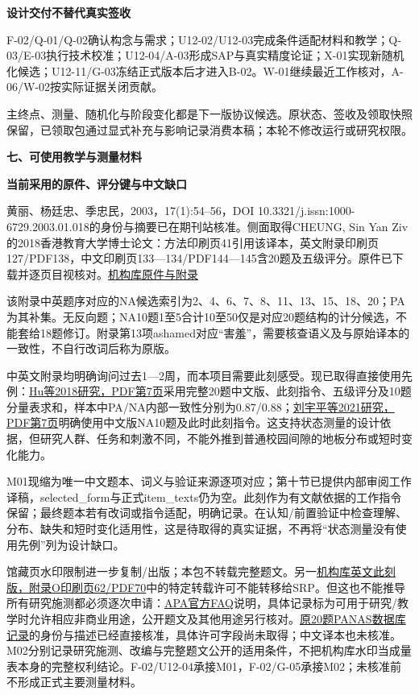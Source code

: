 \documentclass[11pt,a4paper]{article}
\newcommand{\reviewsection}[1]{\par\Needspace{6\baselineskip}\begin{center}{\titlelatin\titlecjk\bfseries\fontsize{14}{20}\selectfont #1}\end{center}}
\newcommand{\reviewsubsection}[1]{\par\Needspace{4\baselineskip}\begin{center}{\titlelatin\titlecjk\bfseries\fontsize{12}{18}\selectfont #1}\end{center}}
\begin{document}
\reviewsubsection{6.2 设计交付不替代真实签收}
F-02/Q-01/Q-02确认构念与需求；U12-02/U12-03完成条件适配材料和教学；Q-03/E-03执行技术校准；U12-04/A-03形成SAP与真实精度论证；X-01实现新随机化候选；U12-11/G-03冻结正式版本后才进入B-02。W-01继续最近工作核对，A-06/W-02按实际证据关闭贡献。

主终点、测量、随机化与阶段变化都是下一版协议候选。原状态、签收及领取快照保留，已领取包通过显式补充与影响记录消费本稿；本轮不修改运行或研究权限。

\newpage\reviewsection{七、可使用教学与测量材料}
\reviewsubsection{7.1 当前采用的原件、评分键与中文缺口}
黄丽、杨廷忠、季忠民，2003，17(1):54–56，DOI 10.3321/\allowbreak{}j.issn:1000-\allowbreak{}6729.2003.01.018的身份与摘要已在期刊站核准。侧面取得CHEUNG, Sin Yan Ziv的2018香港教育大学博士论文：方法印刷页41引用该译本，英文附录印刷页127/PDF138，中文印刷页133—134/PDF144—145含20题及五级评分。原件已下载并逐页目视核对。\href{https://www.lib.eduhk.hk/pure-data/pub/202201871.pdf}{机构库原件与附录}

该附录中英题序对应的NA候选索引为2、4、6、7、8、11、13、15、18、20；PA为其补集。无反向题；NA10题1至5合计10至50仅是对应20题结构的计分候选，不能套给18题修订。附录第13项ashamed对应“害羞”，需要核查语义及与原始译本的一致性，不自行改词后称为原版。

中英文附录均明确询问过去1—2周，而本项目需要此刻感受。现已取得直接使用先例：\href{https://doi.org/10.1111/aphw.12133}{Hu等2018研究，PDF第7页}采用完整20题中文版、此刻指令、五级评分及10题分量表求和，样本中PA/NA内部一致性分别为0.87/0.88；\href{https://doi.org/10.3724/SP.J.1041.2021.00244}{刘宇平等2021研究，PDF第7页}明确使用中文版NA10题及此时此刻指令。这支持状态测量的设计依据，但研究人群、任务和刺激不同，不能外推到普通校园间隙的地板分布或短时变化能力。

M01现缩为唯一中文题本、词义与验证来源逐项对应；第十节已提供内部审阅工作译稿，selected\_form与正式item\_texts仍为空。此刻作为有文献依据的工作指令保留；最终题本若有改词或指令适配，明确记录。在认知/前置验证中检查理解、分布、缺失和短时变化适用性，这是待取得的真实证据，不再将“状态测量没有使用先例”列为设计缺口。

馆藏页水印限制进一步复制/出版；本包不转载完整题文。另一\href{https://vtechworks.lib.vt.edu/bitstreams/6844cae0-de23-4429-afc9-12f4c01bc260/download}{机构库英文此刻版，附录O印刷页62/PDF70}中的特定转载许可不能转移给SRP。但这也不能推导所有研究施测都必须逐次申请：\href{https://www.apa.org/pubs/databases/psyctests/faq}{APA官方FAQ}说明，具体记录标为可用于研究/教学时允许相应非商业用途，公开题文及其他用途另行核对。\href{https://doi.org/10.1037/t03592-000}{原20题PANAS数据库记录}的身份与描述已经直接核准，具体许可字段尚未取得；中文译本也未核准。M02分别记录研究施测、改编与完整题文公开的适用条件，不把机构库水印当成量表本身的完整权利结论。F-02/U12-04承接M01，F-02/G-05承接M02；未核准前不形成正式主要测量材料。
\end{document}
